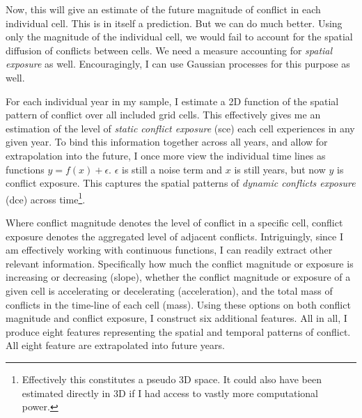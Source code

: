 \documentclass[a4paper]{article}
\begin{document}
Now, this will give an estimate of the future magnitude of conflict in each individual cell. This is in itself a prediction. But we can do much better. Using only the magnitude of the individual cell, we would fail to account for the spatial diffusion of conflicts between cells. We need a measure accounting for \emph{spatial exposure} as well. Encouragingly, I can use Gaussian processes for this purpose as well.\par

For each individual year in my sample, I estimate a 2D function of the spatial pattern of conflict over all included grid cells. This effectively gives me an estimation of the level of \emph{static conflict exposure} (sce) each cell experiences in any given year. To bind this information together across all years, and allow for extrapolation into the future, I once more view the individual time lines as functions $y = f(x) + \epsilon$. $\epsilon$ is still a noise term and $x$ is still years, but now $y$ is conflict exposure. This captures the spatial patterns of \emph{dynamic conflicts exposure} (dce) across time\footnote{Effectively this constitutes a pseudo 3D space. It could also have been estimated directly in 3D if I had access to vastly more computational power.}.\par

Where conflict magnitude denotes the level of conflict in a specific cell, conflict exposure denotes the aggregated level of adjacent conflicts. Intriguingly, since I am effectively working with continuous functions, I can readily extract other relevant information. Specifically how much the conflict magnitude or exposure is increasing or decreasing (slope), whether the conflict magnitude or exposure of a given cell is accelerating or decelerating (acceleration), and the total mass of conflicts in the time-line of each cell (mass). Using these options on both conflict magnitude and conflict exposure, I construct six additional features. All in all, I produce eight features representing the spatial and temporal patterns of conflict. All eight feature are extrapolated into future years.\par
\end{document}
